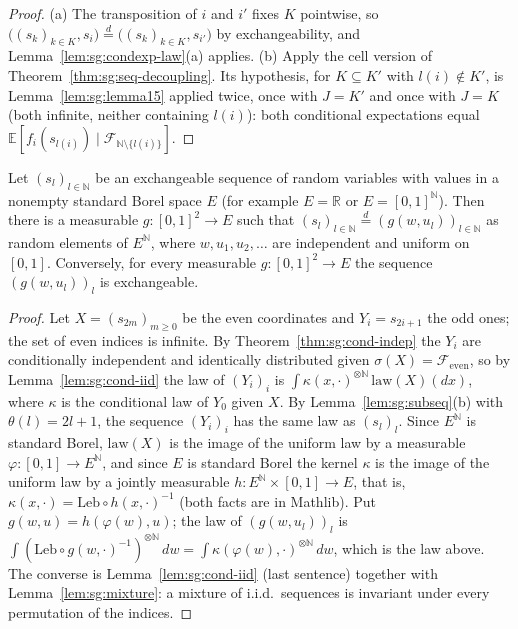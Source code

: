 \begin{proof}
  \leanok
{}
(a) The transposition of $i$ and $i'$ fixes $K$ pointwise, so $\big((s_k)_{k\in K},s_i\big)\overset d=\big((s_k)_{k\in K},s_{i'}\big)$ by exchangeability, and Lemma~\ref{lem:sg:condexp-law}(a) applies.
(b) Apply the cell version of Theorem~\ref{thm:sg:seq-decoupling}. Its hypothesis, for $K\subseteq K'$ with $l(i)\notin K'$, is Lemma~\ref{lem:sg:lemma15} applied twice, once with $J=K'$ and once with $J=K$ (both infinite, neither containing $l(i)$): both conditional expectations equal $\mathbb E[f_i(s_{l(i)})\mid\mathscr F_{\mathbb N\setminus\{l(i)\}}]$.
\end{proof}

\begin{theorem}\label{thm:sg:de-finetti}
  \leanok
Let $(s_l)_{l\in\mathbb N}$ be an exchangeable sequence of random variables with values in a nonempty standard Borel space $E$ (for example $E=\mathbb R$ or $E=[0,1]^{\mathbb N}$). Then there is a measurable $g:[0,1]^2\to E$
such that $(s_l)_{l\in\mathbb N}\overset d=(g(w,u_l))_{l\in\mathbb N}$ as random elements of $E^{\mathbb N}$, where $w,u_1,u_2,\dots$ are independent and uniform on $[0,1]$.
Conversely, for every measurable $g:[0,1]^2\to E$ the sequence $(g(w,u_l))_{l}$ is exchangeable.
\end{theorem}

\begin{proof}
  \leanok
{}
Let $X=(s_{2m})_{m\ge0}$ be the even coordinates and $Y_i=s_{2i+1}$ the odd ones; the set of even indices is infinite. By Theorem~\ref{thm:sg:cond-indep} the $Y_i$ are conditionally independent and identically distributed given $\sigma(X)=\mathscr F_{\text{even}}$,
so by Lemma~\ref{lem:sg:cond-iid} the law of $(Y_i)_i$ is $\int\kappa(x,\cdot)^{\otimes\mathbb N}\,\mathrm{law}(X)(dx)$, where $\kappa$ is the conditional law of $Y_0$ given $X$. By Lemma~\ref{lem:sg:subseq}(b) with $\theta(l)=2l+1$,
the sequence $(Y_i)_i$ has the same law as $(s_l)_l$. Since $E^{\mathbb N}$ is standard Borel, $\mathrm{law}(X)$ is the image of the uniform law by a measurable $\varphi:[0,1]\to E^{\mathbb N}$, and
since $E$ is standard Borel the kernel $\kappa$ is the image of the uniform law by a jointly measurable $h:E^{\mathbb N}\times[0,1]\to E$, that is, $\kappa(x,\cdot)=\mathrm{Leb}\circ h(x,\cdot)^{-1}$ (both facts are in Mathlib). Put $g(w,u)=h(\varphi(w),u)$; the law of
$(g(w,u_l))_l$ is $\int(\mathrm{Leb}\circ g(w,\cdot)^{-1})^{\otimes\mathbb N}\,dw=\int\kappa(\varphi(w),\cdot)^{\otimes\mathbb N}\,dw$, which is the law above. The converse is Lemma~\ref{lem:sg:cond-iid} (last sentence) together with
Lemma~\ref{lem:sg:mixture}: a mixture of i.i.d.\ sequences is invariant under every permutation of the indices.
\end{proof}

